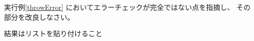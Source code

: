 \begin{Prob}\upshape\label{CorrectErrorCheck}
 実行例\else\ref{throwError}\fi
 においてエラーチェックが完全ではない点を指摘し、
 その部分を改良しなさい。
\end{Prob}
\ifText 結果はリストを貼り付けること\vspace{0.3\textheight}\fi